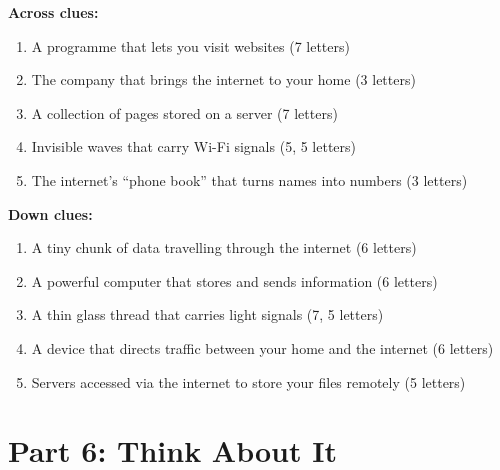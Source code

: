 \begin{tcolorbox}[enhanced,colback=CoralRed!6,colframe=CoralRed,arc=6pt,boxrule=1pt,
  left=10pt,right=10pt,top=8pt,bottom=8pt,
  title={\faPuzzlePiece\quad Internet Word Challenge},fonttitle=\bfseries\large]

\textbf{Across clues:}
\begin{enumerate}[label=\textbf{\arabic*.}]
  \item A programme that lets you visit websites (7 letters)
  \item The company that brings the internet to your home (3 letters)
  \item A collection of pages stored on a server (7 letters)
  \item Invisible waves that carry Wi-Fi signals (5, 5 letters)
  \item The internet's ``phone book'' that turns names into numbers (3 letters)
\end{enumerate}

\vspace{8pt}
\textbf{Down clues:}
\begin{enumerate}[label=\textbf{\arabic*.}]
  \item A tiny chunk of data travelling through the internet (6 letters)
  \item A powerful computer that stores and sends information (6 letters)
  \item A thin glass thread that carries light signals (7, 5 letters)
  \item A device that directs traffic between your home and the internet (6 letters)
  \item Servers accessed via the internet to store your files remotely (5 letters)
\end{enumerate}
\end{tcolorbox}

\vspace{12pt}

\section*{Part 6: Think About It}

